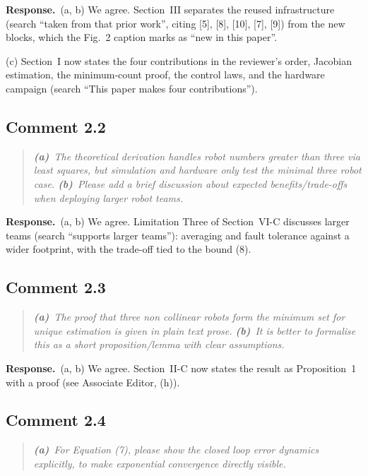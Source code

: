 \documentclass[10pt]{article}
\newcommand{\resp}{\par\textbf{Response.}~}
\begin{document}
\resp (a, b) We agree. Section~III separates the reused infrastructure (search ``taken from that prior work'', citing [5], [8], [10], [7], [9]) from the new blocks, which the Fig.~2 caption marks as ``new in this paper''.

(c) Section~I now states the four contributions in the reviewer's order, Jacobian estimation, the minimum-count proof, the control laws, and the hardware campaign (search ``This paper makes four contributions'').

\subsection*{Comment 2.2}

\begin{quote}\itshape
\textbf{(a)}~The theoretical derivation handles robot numbers greater than three via least squares, but simulation and hardware only test the minimal three robot case.
\textbf{(b)}~Please add a brief discussion about expected benefits/trade-offs when deploying larger robot teams.
\end{quote}

\resp (a, b) We agree. Limitation Three of Section~VI-C discusses larger teams (search ``supports larger teams''): averaging and fault tolerance against a wider footprint, with the trade-off tied to the bound (8).

\subsection*{Comment 2.3}

\begin{quote}\itshape
\textbf{(a)}~The proof that three non collinear robots form the minimum set for unique estimation is given in plain text prose.
\textbf{(b)}~It is better to formalise this as a short proposition/lemma with clear assumptions.
\end{quote}

\resp (a, b) We agree. Section~II-C now states the result as Proposition~1 with a proof (see Associate Editor, (h)).

\subsection*{Comment 2.4}

\begin{quote}\itshape
\textbf{(a)}~For Equation (7), please show the closed loop error dynamics explicitly, to make exponential convergence directly visible.
\end{quote}
\end{document}
